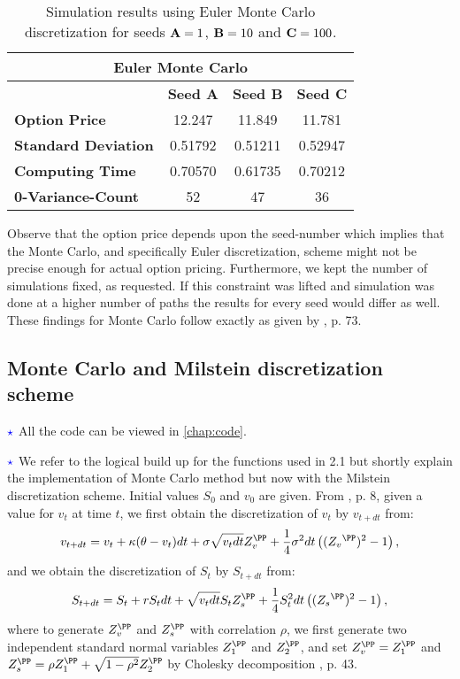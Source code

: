 \documentclass[11pt]{article}
\numberwithin{equation}{section}
\begin{document}
\begin{table}[ht]
    \centering
    \begin{tabular}{|l|c|c|c|}
    \hline
    \multicolumn{4}{|c|}{\textbf{Euler Monte Carlo}} \\ \hline
    \textbf{}  & \textbf{Seed A} & \textbf{Seed B} & \textbf{Seed C} \\ \hline
    \textbf{Option Price} & 12.247 & 11.849 & 11.781 \\ \hline
    \textbf{Standard Deviation} & 0.51792 & 0.51211 & 0.52947 \\ \hline
    \textbf{Computing Time} & 0.70570 & 0.61735 & 0.70212 \\ \hline
    \textbf{0-Variance-Count} & 52 & 47 & 36 \\ \hline
    \end{tabular}
    \caption{Simulation results using Euler Monte Carlo discretization for seeds $\text{\textbf{A}}=1$, $\text{\textbf{B}}=10$ and $\text{\textbf{C}}=100$.}
    \label{table:simulation_results1}
\end{table}



Observe that the option price depends upon the seed-number which implies that the
Monte Carlo, and specifically Euler discretization, scheme might not be precise
enough for actual option pricing.
Furthermore, we kept the number of simulations fixed, as requested. If this
constraint was lifted and simulation was done at a higher number of paths the
results for every seed would differ as well. These findings for Monte Carlo
follow exactly as given by
\cite{Havrylenko2024}, p. 73.
\newpage
\subsection{Monte Carlo and Milstein discretization scheme}
$\textcolor{blue}{\star}$ All the code can be viewed in \autoref{chap:code}.

$\textcolor{blue}{\star}$ We refer to the logical build up for the functions
used in 2.1 but shortly explain the implementation of Monte Carlo method but now with
the Milstein discretization scheme. Initial values $S_0$ and $v_0$ are given. From \cite{Rouah2024}, p. 8, given a value for
$v_t$ at time $t$, we first obtain the discretization of $v_t$ by $v_{t+dt}$ from:
\begin{align*}
    v_{t+dt} = v_t + \kappa(\theta - v_t)dt + \sigma \sqrt{v_tdt}Z_v^\PP+\frac{1}{4}\sigma^2dt\left ((Z_v{^\PP})^2-1 \right ),
\end{align*}
and we obtain the discretization of $S_t$ by $S_{t+dt}$ from:
\begin{align*}
    S_{t+dt} = S_t + rS_tdt + \sqrt{v_t dt}S_tZ_s^\PP+\frac{1}{4}S_t^2dt\left ((Z_s{^\PP})^2-1 \right ),
\end{align*}
where to generate $Z_v^\PP$ and $Z_s^\PP$ with correlation $\rho$, we first
generate two independent standard normal variables $Z_1^\PP$ and $Z_2^\PP$, and
set $Z_v^\PP = Z_1^\PP$ and $Z_s^\PP = \rho Z_1^\PP + \sqrt{1 - \rho^2} Z_2^\PP$ by
Cholesky decomposition \cite{Havrylenko2024}, p. 43.
\end{document}
